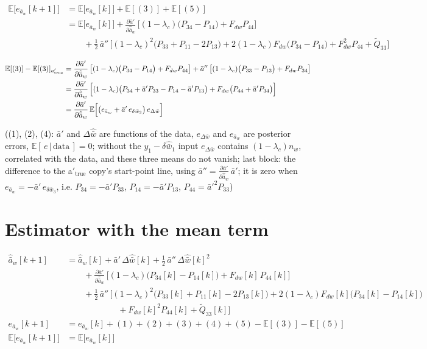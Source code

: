 \documentclass[11pt,a4paper,fontset=none]{ctexart}
\newcommand{\ba}{\bar{a}}
\newcommand{\bw}{\bar{w}}
\newcommand{\E}{\mathbb{E}}
\newcommand{\dWh}{\Delta\hat{\bw}}
\newcommand{\eD}{e_{\Delta\bw}}
\newcommand{\ap}{\ba'}
\newcommand{\app}{\ba''}
\newcommand{\dap}{\frac{\partial\ap}{\partial\hat{\ba}_w}}
\begin{document}
\begin{align*}
\E\bigl[e_{\ba_w}[k+1]\bigr]
  &= \E\bigl[e_{\ba_w}[k]\bigr] + \E[(3)] + \E[(5)] \\
  &= \E\bigl[e_{\ba_w}[k]\bigr] + \dap\,\bigl[(1-\lambda_c)\bigl(P_{34} - P_{14}\bigr) + F_{dw}P_{44}\bigr] \\
  &\qquad + \tfrac{1}{2}\,\app\,\bigl[(1-\lambda_c)^{2}\bigl(P_{33} + P_{11} - 2P_{13}\bigr)
     + 2(1-\lambda_c)F_{dw}\bigl(P_{34} - P_{14}\bigr) + F_{dw}^{2}P_{44} + \tilde{Q}_{33}\bigr]
\end{align*}

\begin{align*}
\E[(3)] - \E[(3)]_{a'_{\mathrm{true}}}
  &= \dap\,\bigl[(1-\lambda_c)\bigl(P_{34} - P_{14}\bigr) + F_{dw}P_{44}\bigr]
     + \app\,\bigl[(1-\lambda_c)\bigl(P_{33} - P_{13}\bigr) + F_{dw}P_{34}\bigr] \\
  &= \dap\,\Bigl[(1-\lambda_c)\bigl(P_{34} + \ap P_{33} - P_{14} - \ap P_{13}\bigr) + F_{dw}\bigl(P_{44} + \ap P_{34}\bigr)\Bigr] \\
  &= \dap\,\E\Bigl[\bigl(e_{\ba_w} + \ap\,e_{\delta\bw_3}\bigr)\,\eD\Bigr]
\end{align*}

((1), (2), (4): $\ap$ and $\dWh$ are functions of the data, $\eD$ and $e_{\ba_w}$ are posterior errors, $\E[\,e\,|\,\text{data}\,] = 0$;
without the $y_1 - \delta\hat{\bw}_1$ input $\eD$ contains $(1-\lambda_c)n_w$, correlated with the data, and these three means do not vanish;
last block: the difference to the a$'_{\mathrm{true}}$ copy's start-point line, using $\app = \dap\,\ap$; it is zero when
$e_{\ba_w} = -\ap\,e_{\delta\bw_3}$, i.e. $P_{34} = -\ap P_{33}$, $P_{14} = -\ap P_{13}$, $P_{44} = \ap^{2}P_{33}$)

\section{Estimator with the mean term}

\begin{align*}
\hat{\ba}_w[k+1] &= \hat{\ba}_w[k] + \ap\,\dWh[k] + \tfrac{1}{2}\,\app\,\dWh[k]^{2} \\
  &\qquad + \dap\,\bigl[(1-\lambda_c)\bigl(P_{34}[k] - P_{14}[k]\bigr) + F_{dw}[k]\,P_{44}[k]\bigr] \\
  &\qquad + \tfrac{1}{2}\,\app\,\bigl[(1-\lambda_c)^{2}\bigl(P_{33}[k] + P_{11}[k] - 2P_{13}[k]\bigr)
     + 2(1-\lambda_c)F_{dw}[k]\bigl(P_{34}[k] - P_{14}[k]\bigr) \\
  &\qquad\qquad\qquad + F_{dw}[k]^{2}P_{44}[k] + \tilde{Q}_{33}[k]\bigr] \\
e_{\ba_w}[k+1] &= e_{\ba_w}[k] + (1) + (2) + (3) + (4) + (5) - \E[(3)] - \E[(5)] \\
\E\bigl[e_{\ba_w}[k+1]\bigr] &= \E\bigl[e_{\ba_w}[k]\bigr]
\end{align*}
\end{document}
